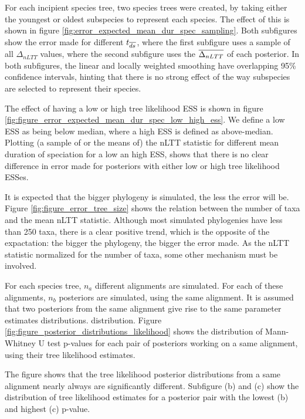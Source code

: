 \documentclass{article}
\begin{document}

For each incipient species tree, two species trees were created, by taking
either the youngest or oldest subspecies to represent each species.
The effect of this is shown in figure \ref{fig:error_expected_mean_dur_spec_sampling}.
Both subfigures show the
error made for different $t_{\overline{ds}}$, where the first subfigure uses a sample
of all $\Delta_{nLTT}$ values, where the second subfigure uses the $\overline{\Delta_{nLTT}}$
of each posterior. In both subfigures, the linear and locally weighted smoothing
have overlapping 95\% confidence intervals, hinting that there is no strong effect
of the way subspecies are selected to represent their species.  


The effect of having a low or high tree likelihood ESS is shown in 
figure \ref{fig:figure_error_expected_mean_dur_spec_low_high_ess}. We
define a low ESS as being below median, where a high ESS is defined as 
above-median. Plotting (a sample of or the means of) the nLTT statistic for different mean
duration of speciation for a low an high ESS, shows that there is no clear
difference in error made for posteriors with either low or high tree likelihood ESSes.

It is expected that the bigger phylogeny is simulated, the less the error
will be. Figure \ref{fig:figure_error_tree_size} shows the relation between the
number of taxa and the mean nLTT statistic. Although most simulated
phylogenies have less than 250 taxa, there is a clear positive trend, 
which is the opposite of the
expactation: the bigger the phylogeny, the bigger the error made.
As the nLTT statistic normalized for the number of taxa, some other
mechanism must be involved. 

For each species tree, $n_a$ different alignments are simulated. For each of
these alignments, $n_b$ posteriors are simulated, using the same alignment. 
It is assumed that two posteriors from the same alignment
give rise to the same parameter estimates distributions.
distribution. Figure \ref{fig:figure_posterior_distributions_likelihood} 
shows the distribution of Mann-Whitney U test p-values for each pair of 
posteriors working on a same alignment, 
using their tree likelihood estimates.

The figure shows that the tree likelihood posterior distributions 
from a same alignment nearly always
are significantly different. Subfigure (b) and (c) show the distribution of
tree likelihood estimates for a posterior pair with the lowest (b) and 
highest (c) p-value.
\end{document}
